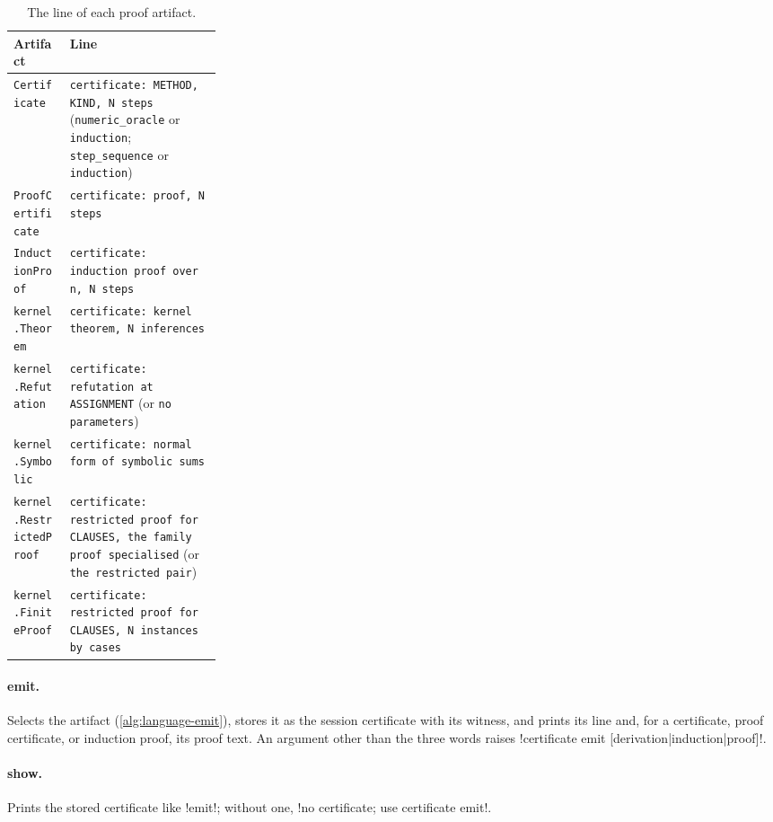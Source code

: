 \begin{table}[H]
\centering\small
\begin{tabularx}{\linewidth}{@{}>{\raggedright\arraybackslash}p{0.27\linewidth}X@{}}
\toprule
Artifact & Line \\
\midrule
\texttt{Certificate} & \texttt{certificate: METHOD, KIND, N steps} (\texttt{numeric\_oracle} or \texttt{induction}; \texttt{step\_sequence} or \texttt{induction}) \\
\texttt{ProofCertificate} & \texttt{certificate: proof, N steps} \\
\texttt{InductionProof} & \texttt{certificate: induction proof over n, N steps} \\
\texttt{kernel.Theorem} & \texttt{certificate: kernel theorem, N inferences} \\
\texttt{kernel.Refutation} & \texttt{certificate: refutation at ASSIGNMENT} (or \texttt{no parameters}) \\
\texttt{kernel.Symbolic} & \texttt{certificate: normal form of symbolic sums} \\
\texttt{kernel.RestrictedProof} & \texttt{certificate: restricted proof for CLAUSES, the family proof specialised} (or \texttt{the restricted pair}) \\
\texttt{kernel.FiniteProof} & \texttt{certificate: restricted proof for CLAUSES, N instances by cases} \\
\bottomrule
\end{tabularx}
\caption{The line of each proof artifact.}
\label{tab:language-artefact-lines}
\end{table}

\paragraph{emit.} Selects the artifact (\cref{alg:language-emit}), stores it as the session certificate with its witness, and prints its line and, for a certificate, proof certificate, or induction proof, its proof text. An argument other than the three words raises \code!certificate emit [derivation|induction|proof]!.

\paragraph{show.} Prints the stored certificate like \code!emit!; without one, \code!no certificate; use certificate emit!.

